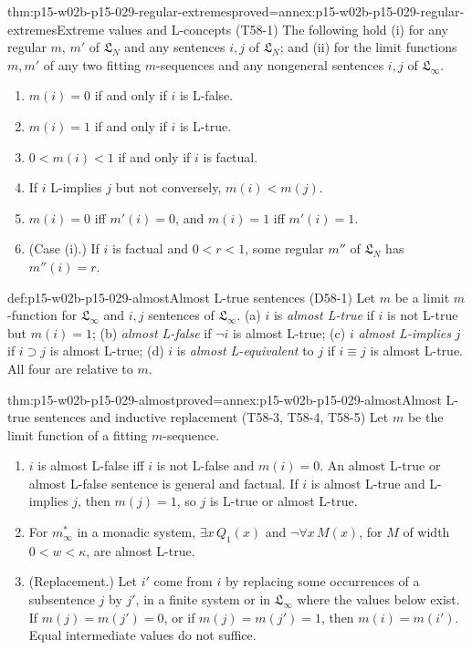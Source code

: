 \begin{hbtheorem}{thm:p15-w02b-p15-029-regular-extremes}{proved=annex:p15-w02b-p15-029-regular-extremes}{Extreme values and L-concepts (T58-1)}
The following hold (i) for any regular \(m\), \(m'\) of
\(\mathfrak L_N\) and any sentences \(i,j\) of \(\mathfrak L_N\); and
(ii) for the limit functions \(m,m'\) of any two fitting
\(m\)-sequences and any nongeneral sentences \(i,j\) of
\(\mathfrak L_\infty\).
\begin{enumerate}
 \item[(a,b)] \(m(i)=0\) if and only if \(i\) is L-false.
 \item[(c,d)] \(m(i)=1\) if and only if \(i\) is L-true.
 \item[(e,f)] \(0<m(i)<1\) if and only if \(i\) is factual.
 \item[(g)] If \(i\) L-implies \(j\) but not conversely, \(m(i)<m(j)\).
 \item[(h)--(k)] \(m(i)=0\) iff \(m'(i)=0\), and \(m(i)=1\) iff
       \(m'(i)=1\).
 \item[(l)] (Case (i).) If \(i\) is factual and \(0<r<1\), some regular
       \(m''\) of \(\mathfrak L_N\) has \(m''(i)=r\).
\end{enumerate}
\end{hbtheorem}

\begin{hbdefinition}{def:p15-w02b-p15-029-almost}{Almost L-true sentences (D58-1)}
Let \(m\) be a limit \(m\)-function for \(\mathfrak L_\infty\) and
\(i,j\) sentences of \(\mathfrak L_\infty\). (a) \(i\) is \emph{almost
L-true} if \(i\) is not L-true but \(m(i)=1\); (b) \emph{almost
L-false} if \(\neg i\) is almost L-true; (c) \(i\) \emph{almost
L-implies} \(j\) if \(i\supset j\) is almost L-true; (d) \(i\) is
\emph{almost L-equivalent} to \(j\) if \(i\equiv j\) is almost L-true.
All four are relative to \(m\).
\end{hbdefinition}

\begin{hbtheorem}{thm:p15-w02b-p15-029-almost}{proved=annex:p15-w02b-p15-029-almost}{Almost L-true sentences and inductive replacement (T58-3, T58-4, T58-5)}
Let \(m\) be the limit function of a fitting \(m\)-sequence.
\begin{enumerate}
 \item \(i\) is almost L-false iff \(i\) is not L-false and
       \(m(i)=0\). An almost L-true or almost L-false sentence is
       general and factual. If \(i\) is almost L-true and L-implies
       \(j\), then \(m(j)=1\), so \(j\) is L-true or almost L-true.
 \item For \(m^*_\infty\) in a monadic system, \(\exists x\,Q_1(x)\)
       and \(\neg\forall x\,M(x)\), for \(M\) of width \(0<w<\kappa\),
       are almost L-true.
 \item (Replacement.) Let \(i'\) come from \(i\) by replacing some
       occurrences of a subsentence \(j\) by \(j'\), in a finite system
       or in \(\mathfrak L_\infty\) where the values below exist. If
       \(m(j)=m(j')=0\), or if \(m(j)=m(j')=1\), then
       \(m(i)=m(i')\). Equal intermediate values do not suffice.
\end{enumerate}
\end{hbtheorem}

